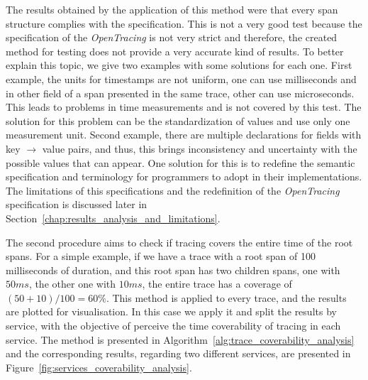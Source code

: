 
The results obtained by the application of this method were that every span structure complies with the specification. This is not a very good test because the specification of the \emph{OpenTracing} is not very strict and therefore, the created method for testing does not provide a very accurate kind of results. To better explain this topic, we give two examples with some solutions for each one. First example, the units for timestamps are not uniform, one can use milliseconds and in other field of a span presented in the same trace, other can use microseconds. This leads to problems in time measurements and is not covered by this test. The solution for this problem can be the standardization of values and use only one measurement unit. Second example, there are multiple declarations for fields with key $\rightarrow$ value pairs, and thus, this brings inconsistency and uncertainty with the possible values that can appear. One solution for this is to redefine the semantic specification and terminology for programmers to adopt in their implementations. The limitations of this specifications and the redefinition of the \emph{OpenTracing} specification is discussed later in Section~\ref{chap:results_analysis_and_limitations}.



The second procedure aims to check if tracing covers the entire time of the root spans. For a simple example, if we have a trace with a root span of 100 milliseconds of duration, and this root span has two children spans, one with $50ms$, the other one with $10ms$, the entire trace has a coverage of $(50+10)/100=60\%$. This method is applied to every trace, and the results are plotted for visualisation. In this case we apply it and split the results by service, with the objective of perceive the time coverability of tracing in each service. The method is presented in Algorithm~\ref{alg:trace_coverability_analysis} and the corresponding results, regarding two different services, are presented in Figure~\ref{fig:services_coverability_analysis}.


